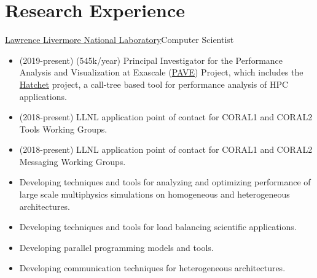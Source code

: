 \section{Research Experience}
		{\href{http://www.llnl.gov}{Lawrence Livermore National Laboratory}}{Computer Scientist}{}{}
		{\begin{itemize}
		\item (2019-present) (545k/year) Principal Investigator for the Performance Analysis and Visualization at Exascale (\href{https://computing.llnl.gov/projects/pave-performance-analysis-visualization-exascale}{PAVE}) Project,
          which includes the \href{https://hatchet.readthedocs.io/en/latest/}{Hatchet} project, a call-tree based tool for performance analysis of HPC applications.
		\item (2018-present) LLNL application point of contact for CORAL1 and CORAL2 Tools Working Groups.
		\item (2018-present) LLNL application point of contact for CORAL1 and CORAL2 Messaging Working Groups.
		\item Developing techniques and tools for analyzing and optimizing performance of large scale multiphysics simulations on homogeneous and heterogeneous architectures.
		\item Developing techniques and tools for load balancing scientific applications.
		\item Developing parallel programming models and tools.
		\item Developing communication techniques for heterogeneous architectures.
		\end{itemize}}

